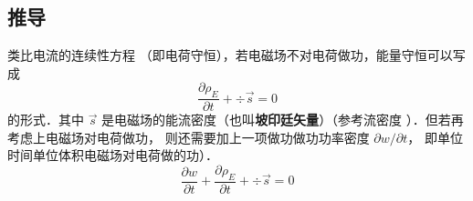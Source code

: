 \subsection{推导}
类比电流的连续性方程%
（即电荷守恒），若电磁场不对电荷做功，能量守恒可以写成
\begin{equation}
\frac{{\partial {\rho _E}}}{{\partial t}} + \div \vec s = 0
\end{equation} 
的形式．其中 $\vec s$ 是电磁场的能流密度（也叫\textbf{坡印廷矢量}）（参考流密度%
）．但若再考虑上电磁场对电荷做功， 则还需要加上一项做功做功功率密度 $\partial w/\partial t$， 即单位时间单位体积电磁场对电荷做的功）．
\begin{equation}\label{EBS_eq1}
\frac{{\partial w}}{{\partial t}} + \frac{{\partial {\rho _E}}}{{\partial t}} + \div \vec s = 0
\end{equation} 

